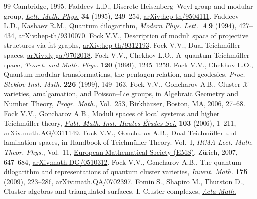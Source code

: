 \documentclass[pdftex]{sigma}
\numberwithin{equation}{section}
\theoremstyle{definition}
\begin{document}
\begin{thebibliography}{99}
 Cambridge, 1995.
Faddeev L.D., Discrete {H}eisenberg--{W}eyl group and modular group,
 \href{https://doi.org/10.1007/BF01872779}{\textit{Lett. Math. Phys.}}
 \textbf{34} (1995), 249--254,
 \href{http://arxiv.org/abs/hep-th/9504111}{arXiv:hep-th/9504111}.
Faddeev L.D., Kashaev R.M., Quantum dilogarithm,
 \href{https://doi.org/10.1142/S0217732394000447}{\textit{Modern Phys.
 Lett.~A}} \textbf{9} (1994), 427--434,
 \href{http://arxiv.org/abs/hep-th/9310070}{arXiv:hep-th/9310070}.
Fock V.V., Description of moduli space of projective structures via fat graphs,
 \href{http://arxiv.org/abs/hep-th/9312193}{arXiv:hep-th/9312193}.
Fock V.V., Dual {T}eichm\"{u}ller spaces,
 \href{http://arxiv.org/abs/dg-ga/9702018}{arXiv:dg-ga/9702018}.
Fock V.V., Chekhov L.O., A~quantum {T}eichm\"{u}ller space,
 \href{https://doi.org/10.1007/BF02557246}{\textit{Teoret. and Math. Phys.}}
 \textbf{120} (1999), 1245--1259.
Fock V.V., Chekhov L.O., Quantum modular transformations, the pentagon
 relation, and geodesics, \textit{Proc. Steklov Inst. Math.} \textbf{226}
 (1999), 149--163.
Fock V.V., Goncharov A.B., Cluster {$\mathscr{X}$}-varieties, amalgamation, and
 {P}oisson--{L}ie groups, in Algebraic Geometry and Number Theory,
 \textit{Progr. Math.}, Vol.~253,
 \href{https://doi.org/10.1007/978-0-8176-4532-8_2}{Birkh\"{a}user}, Boston,
 MA, 2006, 27--68.
Fock V.V., Goncharov A.B., Moduli spaces of local systems and higher
 {T}eichm\"{u}ller theory,
 \href{https://doi.org/10.1007/s10240-006-0039-4}{\textit{Publ. Math. Inst.
 Hautes \'{E}tudes Sci.}} \textbf{103} (2006), 1--211,
 \href{http://arxiv.org/abs/math.AG/0311149}{arXiv:math.AG/0311149}.
Fock V.V., Goncharov A.B., Dual {T}eichm\"{u}ller and lamination spaces, in
 Handbook of {T}eichm\"{u}ller Theory. {V}ol.~{I}, \textit{IRMA Lect. Math.
 Theor. Phys.}, Vol.~11, \href{https://doi.org/10.4171/029-1/16}{European
 Mathematical Society (EMS)}, Z\"{u}rich, 2007, 647--684,
 \href{http://arxiv.org/abs/math.DG/0510312}{arXiv:math.DG/0510312}.
Fock V.V., Goncharov A.B., The quantum dilogarithm and representations of
 quantum cluster varieties,
 \href{https://doi.org/10.1007/s00222-008-0149-3}{\textit{Invent. Math.}}
 \textbf{175} (2009), 223--286,
 \href{http://arxiv.org/abs/math.QA/0702397}{arXiv:math.QA/0702397}.
Fomin S., Shapiro M., Thurston D., Cluster algebras and triangulated surfaces.
 {I}. {C}luster complexes,
 \href{https://doi.org/10.1007/s11511-008-0030-7}{\textit{Acta Math.}}

\end{thebibliography}
\end{document}
